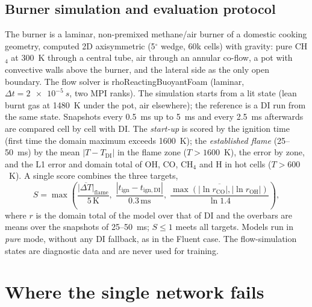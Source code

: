 \documentclass[preprint,review,12pt]{elsarticle}
\begin{document}
\subsection{Burner simulation and evaluation protocol}
\label{sec:protocol}
The burner is a laminar, non-premixed methane/air burner of a domestic cooking geometry, computed 2D
axisymmetric (5$^\circ$ wedge, 60k cells) with gravity: pure CH$_4$ at 300~K through a central tube, air
through an annular co-flow, a pot with convective walls above the burner, and the lateral side as the
only open boundary. The flow solver is rhoReactingBuoyantFoam (laminar, $\Delta t=\SI{2e-5}{s}$, two MPI
ranks). The simulation starts from a lit state (lean burnt gas at 1480~K under the pot, air elsewhere);
the reference is a DI run from the same state. Snapshots every 0.5~ms up to 5~ms and every 2.5~ms
afterwards are compared cell by cell with DI. The \emph{start-up} is scored by the ignition time (first
time the domain maximum exceeds 1600~K); the \emph{established flame} (25--50~ms) by the mean
$|T-T_\mathrm{DI}|$ in the flame zone ($T>1600$~K), the error by zone, and the L1 error and domain total of
OH, CO, CH$_4$ and H in hot cells ($T>600$~K). A single score combines the three targets,
\begin{equation}
  S=\max\!\left(\frac{\overline{|\Delta T|}_\mathrm{flame}}{5\,\mathrm{K}},\;
  \frac{|t_\mathrm{ign}-t_\mathrm{ign,DI}|}{0.3\,\mathrm{ms}},\;
  \frac{\overline{\max(|\ln r_\mathrm{CO}|,|\ln r_\mathrm{OH}|)}}{\ln 1.4}\right),
\end{equation}
where $r$ is the domain total of the model over that of DI and the overbars are means over the snapshots
of 25--50~ms; $S\le1$ meets all targets. Models run in \emph{pure} mode, without any DI fallback, as in
the Fluent case. The flow-simulation states are diagnostic data and are never used for training.

\section{Where the single network fails}
\label{sec:errmap}
\end{document}
